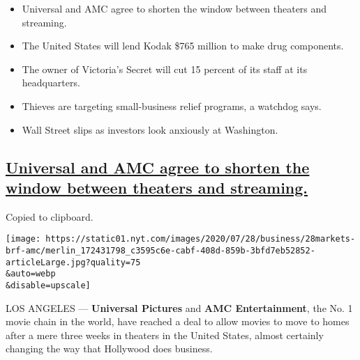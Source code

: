 \begin{itemize}
\item
  \protect\hyperlink{universal-and-amc-agree-to-shorten-the-window-between-theaters-and-streaming}{}

  Universal and AMC agree to shorten the window between theaters and
  streaming.
\item
  \protect\hyperlink{the-united-states-will-lend-kodak-765-million-to-make-drug-components}{}

  The United States will lend Kodak \$765 million to make drug
  components.
\item
  \protect\hyperlink{the-owner-of-victorias-secret-will-cut-15-percent-of-its-staff-at-its-headquarters}{}

  The owner of Victoria's Secret will cut 15 percent of its staff at its
  headquarters.
\item
  \protect\hyperlink{thieves-are-targeting-small-business-relief-programs-a-watchdog-says}{}

  Thieves are targeting small-business relief programs, a watchdog says.
\item
  \protect\hyperlink{wall-street-slips-as-investors-look-anxiously-at-washington}{}

  Wall Street slips as investors look anxiously at Washington.
\end{itemize}

\hypertarget{universal-and-amc-agree-to-shorten-the-window-between-theaters-and-streaming}{%
\subsection{\texorpdfstring{\protect\hyperlink{universal-and-amc-agree-to-shorten-the-window-between-theaters-and-streaming}{Universal
and AMC agree to shorten the window between theaters and
streaming.}}{Universal and AMC agree to shorten the window between theaters and streaming.}}\label{universal-and-amc-agree-to-shorten-the-window-between-theaters-and-streaming}}

Copied to clipboard.

\texttt{[image: https://static01.nyt.com/images/2020/07/28/business/28markets-brf-amc/merlin\_172431798\_c3595c6e-cabf-408d-859b-3bfd7eb52852-articleLarge.jpg?quality=75\\\&auto=webp\\\&disable=upscale]}

LOS ANGELES --- \textbf{Universal Pictures} and \textbf{AMC
Entertainment}, the No. 1 movie chain in the world, have reached a deal
to allow movies to move to homes after a mere three weeks in theaters in
the United States, almost certainly changing the way that Hollywood does
business.

